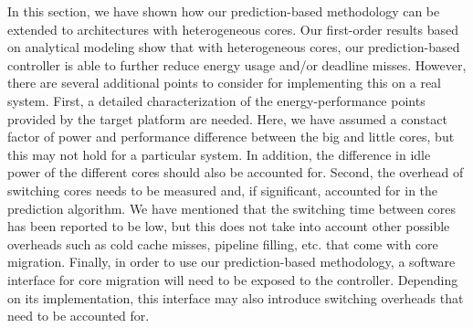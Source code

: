 In this section, we have shown how our prediction-based methodology can be
extended to architectures with heterogeneous cores. Our first-order results
based on analytical modeling show that with heterogeneous cores, our
prediction-based controller is able to further reduce energy usage and/or
deadline misses. However, there are several additional points to consider for
implementing this on a real system. First, a detailed characterization of the
energy-performance points provided by the target platform are needed.  Here, we
have assumed a constact factor of power and performance difference between the
big and little cores, but this may not hold for a particular system. In
addition, the difference in idle power of the different cores should also be
accounted for. Second, the overhead of switching cores needs to be measured
and, if significant, accounted for in the prediction algorithm. We have
mentioned that the switching time between cores has been reported to be low,
but this does not take into account other possible overheads such as cold cache
misses, pipeline filling, etc. that come with core migration. Finally, in order
to use our prediction-based methodology, a software interface for core
migration will need to be exposed to the controller. Depending on its
implementation, this interface may also introduce switching overheads that need
to be accounted for.

